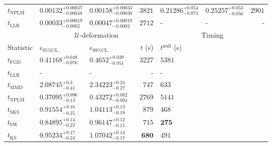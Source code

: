\begin{tabular}{l|llr|llr}
\rowcolor{red!35}	$t_{\mathrm{NPLM}}$ & $0.00132_{-0.00048}^{+0.00037}$ & $0.00158_{-0.00038}^{+0.00033}$ & $3821$ & $0.21286_{-0.073}^{+0.054}$ & $0.25257_{-0.056}^{+0.053}$ & $2901$ \\
	$t_{\mathrm{LLR}}$ & $0.00033_{-0.0002}^{+0.00019}$ & $0.00047_{-0.0002}^{+0.00019}$ & $2712$ & - & - & - \\
	\toprule
	\multicolumn{1}{c}{} & \multicolumn{3}{c}{$\mathcal{U}$-deformation} & \multicolumn{3}{c}{Timing} \\
	Statistic & $\epsilon_{95\%\mathrm{CL}}$ & $\epsilon_{99\%\mathrm{CL}}$ & $t$ (s) & $t^{\mathrm{null}}$ (s) \\
	\midrule
	$t_{\mathrm{FGD}}$ & ${\mathbf{0.41168_{-0.076}^{+0.048}}}$ & ${\mathbf{0.4652_{-0.051}^{+0.039}}}$ & $3227$ & $5381$ \\
	$t_{\mathrm{LLR}}$ & - & - & - & - \\
	$t_{\mathrm{MMD}}$ & $2.08745_{-0.41}^{+0.3}$ & $2.34223_{-0.27}^{+0.24}$ & $747$ & $633$ \\
\rowcolor{red!35}	$t_{\mathrm{NPLM}}$ & $0.37095_{-0.13}^{+0.096}$ & $0.43272_{-0.094}^{+0.082}$ & $2769$ & $5141$ \\
	$t_{\mathrm{SKS}}$ & $0.91554_{-0.25}^{+0.16}$ & $1.04113_{-0.19}^{+0.13}$ & $879$ & $468$ \\
	$t_{\mathrm{SW}}$ & $0.84895_{-0.22}^{+0.14}$ & $0.96147_{-0.15}^{+0.12}$ & $715$ & ${\mathbf{275}}$ \\
	$t_{\overline{\mathrm{KS}}}$ & $0.95234_{-0.24}^{+0.17}$ & $1.07042_{-0.17}^{+0.14}$ & ${\mathbf{680}}$ & $491$ \\
	\bottomrule
\end{tabular}